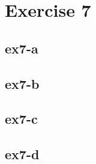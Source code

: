 \section{Exercise 7}
\subsection{ex7-a}

\subsection{ex7-b}

\subsection{ex7-c}

\subsection{ex7-d}
